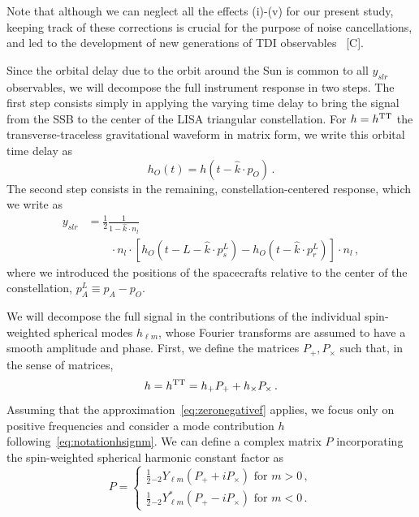 \documentclass[aps,showpacs,twocolumn,
prd,superscriptaddress,nofootinbib]{revtex4-1}
\newcommand{\be}{\begin{equation}}
\newcommand{\ee}{\end{equation}}
\newcommand{\nn}{\nonumber}
\newcommand{\SM}[1]{{\color{Red} #1}}
\begin{document}
Note that although we can neglect all the effects (i)-(v) for our present study, keeping track of these corrections is crucial for the purpose of noise cancellations, and led to the development of new generations of TDI observables~\cite{} \SM{[C]}.

Since the orbital delay due to the orbit around the Sun is common to all $y_{slr}$ observables, we will decompose the full instrument response in two steps. The first step consists simply in applying the varying time delay to bring the signal from the SSB to the center of the LISA triangular constellation. For $h=h^{\rm TT}$ the transverse-traceless gravitational waveform in matrix form, we write this orbital time delay as
\be\label{eq:defresponseO}
	h_{O} (t) = h(t-\hat{k}\cdot p_{O}) \,.
\ee
The second step consists in the remaining, constellation-centered response, which we write as
\begin{align}\label{eq:dfresponsec}
	y_{slr} &= \frac{1}{2} \frac{1}{1 - \hat{k}\cdot n_{l}} \nn\\
	& \qquad \cdot n_{l}\cdot \left[ h_{O}(t - L - \hat{k}\cdot p^{L}_{s}) - h_{O}(t - \hat{k}\cdot p^{L}_{r}) \right] \cdot n_{l}\,,
\end{align}
where we introduced the positions of the spacecrafts relative to the center of the constellation, $p^{L}_{A} \equiv p_{A} - p_{O}$.

We will decompose the full signal in the contributions of the individual spin-weighted spherical modes $h_{\ell m}$, whose Fourier transforms are assumed to have a smooth amplitude and phase. First, we define the matrices $P_{+},P_{\times}$ such that, in the sense of matrices,
\be
	h = h^{\rm TT} = h_{+}P_{+} + h_{\times}P_{\times} \,.
\ee
Assuming that the approximation~\eqref{eq:zeronegativef} applies, we focus only on positive frequencies and consider a mode contribution $h$ following~\eqref{eq:notationhsignm}. We can define a complex matrix $P$ incorporating the spin-weighted spherical harmonic constant factor as
\be
	P = 
	\begin{cases} 
	\frac{1}{2} {}_{-2}Y_{\ell m} \left( P_{+} + i P_{\times} \right) \text{ for } m>0\,,\\
	\frac{1}{2} {}_{-2}Y_{\ell m}^{*} \left( P_{+} - i P_{\times} \right) \text{ for } m<0\,.
	\end{cases}
\ee
\end{document}
